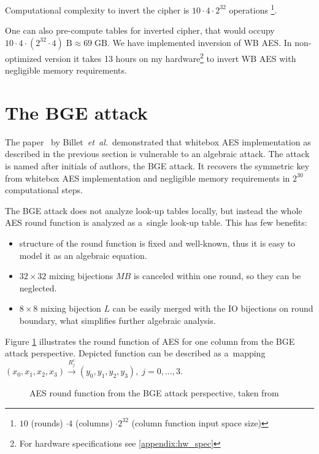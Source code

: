 \documentclass[11pt,oneside,final]{fithesis2}
\newcommand{\eal}{\emph{et~al.}}
\begin{document}
    Computational complexity to invert the cipher
    is $10 \cdot 4 \cdot 2^{32}$ operations \footnote{ $10$ (rounds) $\cdot 4$ (columns) $ \cdot 2^{32}$ (column function input space size)}.
    
    One can also pre-compute tables for inverted cipher, that would occupy $10 \cdot 4 \cdot (2^{32} \cdot 4)\;\text{B} \approx 69\;\text{GB}$.
    We have implemented inversion of WB AES. In non-optimized version it takes 13 hours on my hardware\footnote{For hardware specifications see \ref{appendix:hw_spec}} 
    to invert WB AES with negligible memory requirements.

    \section{The BGE attack}\label{sec:bge_attack}
    The paper~\citep{Billet:2004:CWB:2080787.2080809} by Billet~\eal~demonstrated that whitebox AES implementation as described in the previous section is vulnerable
    to an algebraic attack. The attack is named after initials of authors, the BGE attack. It recovers the symmetric key from whitebox AES implementation and
    negligible memory requirements in $2^{30}$ computational steps.
    
    The BGE attack does not analyze look-up tables locally, but instead the whole AES round function is analyzed as a~single look-up table. This has few benefits:
    \begin{itemize}
     \item structure of the round function is fixed and well-known, thus it is easy to model it as an algebraic equation.
     \item $32\times32$ mixing bijections $MB$ is canceled within one round, so they can be neglected.
     \item $8\times8$ mixing bijection $L$ can be easily merged with the IO bijections on round boundary, what simplifies further algebraic analysis. 
    \end{itemize}
    
    Figure \ref{fig:aes_round_bge} illustrates the round function of AES for one column from the BGE attack perspective. Depicted function can 
    be described as a~mapping $\left(x_0, x_1, x_2, x_3\right) \xrightarrow{R^r_j} \left(y_0, y_1, y_2, y_3\right), \; j=0,\dots,3$.   
    
    \begin{figure}
    \begin{center}
    \leavevmode
    \centerline{}
    \end{center}
    \caption{AES round function from the BGE attack perspective, taken from~\citep{Billet:2004:CWB:2080787.2080809}}
    \label{fig:aes_round_bge}
    \end{figure} 
\end{document}

